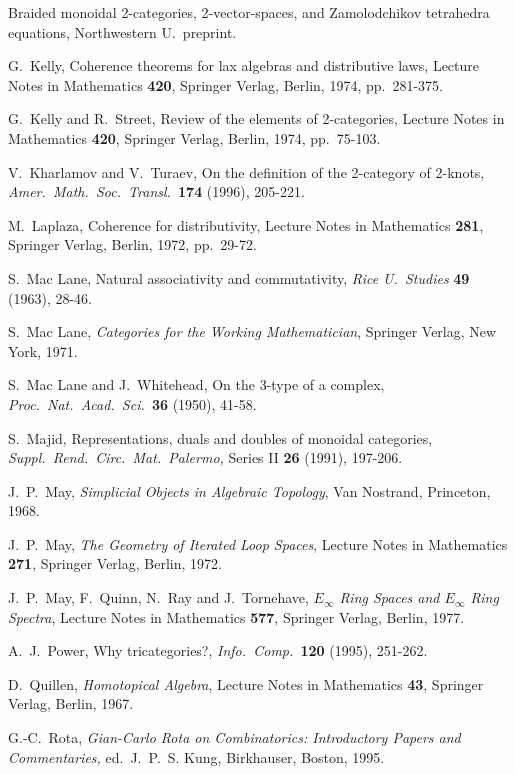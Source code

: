 {\begin{thebibliography}{10}
Braided monoidal 2-categories, 2-vector-spaces, and Zamolodchikov
tetrahedra equations, Northwestern U.\ preprint.

 G.\ Kelly, Coherence theorems for lax algebras
and distributive laws, Lecture Notes in Mathematics
{\bf 420}, Springer Verlag, Berlin, 1974, pp.\ 281-375.

 G.\ Kelly and R.\ Street, Review of the elements of
2-categories, Lecture Notes in Mathematics {\bf 420}, Springer Verlag, Berlin,
1974, pp.\ 75-103.

 V.\ Kharlamov and V.\ Turaev, On the definition of the
2-category of 2-knots, {\sl Amer.\ Math.\ Soc.\ Transl.\ }{\bf 174}
(1996), 205-221.

 M.\ Laplaza, Coherence for distributivity,
Lecture Notes in Mathematics {\bf 281}, Springer Verlag, Berlin, 1972,
pp.\ 29-72.

 S.\ Mac Lane, Natural associativity and
commutativity, {\sl Rice U.\ Studies} {\bf 49} (1963), 28-46.

 S.\ Mac Lane, {\sl Categories for the Working
Mathematician}, Springer Verlag, New York, 1971.

 S.\ Mac Lane and J.\ Whitehead, On the 3-type of a complex,
{\sl Proc.\ Nat.\ Acad.\ Sci.\ }{\bf 36} (1950), 41-58.

 S.\ Majid, Representations, duals and doubles of
monoidal categories,  {\sl Suppl.\ Rend.\ Circ.\ Mat.\ Palermo,} Series
II {\bf 26} (1991), 197-206.  

 J.\ P.\ May, {\sl Simplicial Objects in Algebraic Topology},
Van Nostrand, Princeton, 1968.

 J.\ P.\ May, {\sl The Geometry of Iterated Loop Spaces},
Lecture Notes in Mathematics {\bf 271}, Springer Verlag, Berlin, 1972.

 J.\ P.\ May, F.\ Quinn, N.\ Ray and J.\ Tornehave, 
{\sl $E_\infty$ Ring Spaces and $E_\infty$ Ring Spectra},
Lecture Notes in Mathematics {\bf 577}, Springer Verlag, Berlin, 1977.

 A.\ J.\ Power, Why tricategories?, {\it Info.\ Comp.\
}{\bf 120} (1995), 251-262.

 D.\ Quillen, {\sl Homotopical Algebra}, Lecture
Notes in Mathematics {\bf 43}, Springer Verlag, Berlin, 1967.

 G.-C.\ Rota, {\sl Gian-Carlo Rota on Combinatorics: 
Introductory Papers and Commentaries,} ed.\ J.\ P.\ S. Kung, Birkhauser,
Boston, 1995.


\end{thebibliography}}
